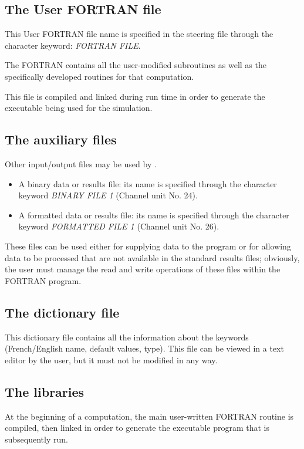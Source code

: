 \subsection{ The User FORTRAN file}

 This User FORTRAN file name is specified in the steering file through the character keyword: \textit{FORTRAN FILE}.\textit{}

 The FORTRAN contains all the user-modified \tomawac subroutines as well as the specifically developed routines for that computation.

 This file is compiled and linked during run time in order to generate the executable being used for the simulation.


\subsection{ The auxiliary files}

 Other input/output files may be used by \tomawac.

\begin{itemize}
\item  A binary data or results file: its name is specified through the character keyword \textit{BINARY FILE 1} (Channel unit No. 24).
\item  A formatted data or results file: its name is specified through the character keyword \textit{FORMATTED FILE 1} (Channel unit No. 26).
\end{itemize}

 These files can be used either for supplying data to the program or for allowing data to be processed that are not available in the standard results files; obviously, the user must manage the read and write operations of these files within the FORTRAN program.


\subsection{ The dictionary file}

 This dictionary file contains all the information about the keywords (French/English name, default values, type). This file can be viewed in a text editor by the user, but it must not be modified in any way.


\subsection{ The libraries}

 At the beginning of a computation, the main user-written FORTRAN routine is compiled, then linked in order to generate the executable program that is subsequently run.

